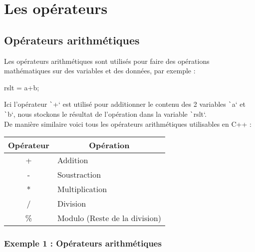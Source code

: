 \documentclass[10pt]{article}
\begin{document}
\section{Les opérateurs}

\subsection{Opérateurs arithmétiques}

Les opérateurs arithmétiques sont utilisés pour faire des opérations mathématiques sur des variables et des données, par exemple :
\begin{textcode}
    rslt = a+b;
\end{textcode}

Ici l'opérateur \texttt`+` est utilisé pour additionner le contenu des 2 variables \texttt`a` et \texttt`b`, nous stockons le résultat de l'opération dans la variable \texttt`rslt`.\\ De manière similaire voici tous les opérateurs arithmétiques utilisables en C++ :

\begin{table}[H]
    \centering
    \begin{tabular}{|c|l|}
    \hline
    \textbf{Opérateur} & \multicolumn{1}{c|}{\textbf{Opération}} \\ \hline
    +                 & Addition                                \\ \hline
    -                 & Soustraction                            \\ \hline
    *                 & Multiplication                          \\ \hline
    /                 & Division                                \\ \hline
    \%                & Modulo (Reste de la division)           \\ \hline
    \end{tabular}
\end{table}


\subsubsection{Exemple 1 : Opérateurs arithmétiques}
\end{document}
